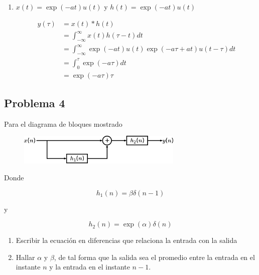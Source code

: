 \documentclass[a4paper,12pt,final]{article}
\begin{document}
\begin{enumerate}[label=\alph*)]
        \item $x\left(t\right) = \exp\left(-at\right) u(t)$ y $h(t) = \exp\left(-at\right) u(t)$

          \begin{equation*}
            \begin{split}
              y\left(\tau\right) & = x\left(t\right) * h\left(t\right) \\
                                 & = \int_{-\infty}^{\infty} x\left(t\right)h\left(\tau-t\right)dt \\
                                 & = \int_{-\infty}^{\infty} \exp\left(-at\right) u(t) \exp\left(-a\tau + at\right) u(t-\tau) dt\\
                                 & = \int_{0}^{\tau} \exp\left(-a\tau\right) dt \\
                                 & = \exp\left(-a\tau\right) \tau
            \end{split}
          \end{equation*}

      \end{enumerate}

  \newpage
  \subsection*{Problema 4}
    \noindent Para el diagrama de bloques mostrado
    \begin{figure}[H]
      \begin{center}
        \includegraphics[width=0.7\textwidth]{./laboratorio_3/problema04_diagram.png}
      \end{center}
    \end{figure}

    \noindent Donde

    $$h_1\left(n\right) = \beta\delta\left(n-1\right)$$

    \noindent y

    $$h_2\left(n\right) = \exp\left(\alpha\right)\delta\left(n\right)$$

    \begin{enumerate}[label=\alph*)]
      \item Escribir la ecuación en diferencias que relaciona la entrada con la salida
      \item Hallar $\alpha$ y $\beta$, de tal forma que la salida sea el promedio entre la entrada en el instante $n$ y
      la entrada en el instante $n-1$.
    \end{enumerate}
\end{document}
